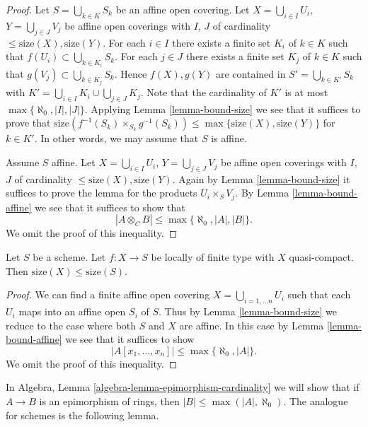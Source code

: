 \begin{proof}
Let $S = \bigcup_{k \in K} S_k$ be an affine open covering.
Let $X = \bigcup_{i \in I} U_i$, $Y = \bigcup_{j \in J} V_j$
be affine open coverings with $I$, $J$ of cardinality
$\leq \text{size}(X), \text{size}(Y)$.
For each $i \in I$ there exists a finite set $K_i$ of $k \in K$
such that $f(U_i) \subset \bigcup_{k \in K_i} S_k$.
For each $j \in J$ there exists a finite set $K_j$ of $k \in K$
such that $g(V_j) \subset \bigcup_{k \in K_j} S_k$.
Hence $f(X), g(Y)$ are contained in
$S' = \bigcup_{k \in K'} S_k$ with
$K' = \bigcup_{i \in I} K_i \cup \bigcup_{j \in J} K_j$.
Note that the cardinality of $K'$
is at most $\max\{\aleph_0, |I|, |J|\}$. Applying
Lemma \ref{lemma-bound-size}
we see that it suffices to prove that
$\text{size}(f^{-1}(S_k) \times_{S_k} g^{-1}(S_k))
\leq \max\{\text{size}(X), \text{size}(Y)\}$ for $k \in K'$.
In other words, we may assume that $S$ is affine.

\medskip\noindent
Assume $S$ affine.
Let $X = \bigcup_{i \in I} U_i$, $Y = \bigcup_{j \in J} V_j$
be affine open coverings with $I$, $J$ of cardinality
$\leq \text{size}(X), \text{size}(Y)$.
Again by
Lemma \ref{lemma-bound-size}
it suffices to prove the lemma for the products
$U_i \times_S V_j$. By
Lemma \ref{lemma-bound-affine}
we see that it suffices to show that
$$
|A \otimes_C B| \leq \max\{\aleph_0, |A|, |B|\}.
$$
We omit the proof of this inequality.
\end{proof}

\begin{lemma}
\label{lemma-bound-finite-type}
Let $S$ be a scheme.
Let $f : X \to S$ be locally of finite type with $X$ quasi-compact.
Then $\text{size}(X) \leq \text{size}(S)$.
\end{lemma}

\begin{proof}
We can find a finite affine open covering $X = \bigcup_{i = 1, \ldots n} U_i$
such that each $U_i$ maps into an affine open $S_i$ of $S$. Thus by
Lemma \ref{lemma-bound-size}
we reduce to the case where both $S$ and $X$ are affine. In this case by
Lemma \ref{lemma-bound-affine}
we see that it suffices to show
$$
|A[x_1, \ldots, x_n]| \leq \max\{\aleph_0, |A|\}.
$$
We omit the proof of this inequality.
\end{proof}

\noindent
In
Algebra, Lemma \ref{algebra-lemma-epimorphism-cardinality}
we will show that if $A \to B$ is an epimorphism of rings, then
$|B| \leq \max(|A|, \aleph_0)$.
The analogue for schemes is the following lemma.

